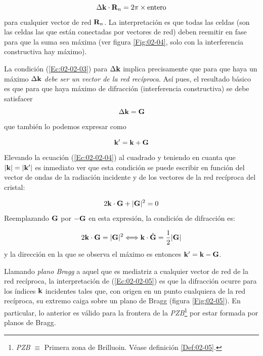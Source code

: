 \begin{equation}
    \Delta \mathbf{k} \cdot \mathbf{R}_n = 2 \pi \times \text{entero} \label{Ec:02-02-03}
\end{equation}
para cualquier vector de red $\mathbf{R}_n$. La interpretación es que todas las celdas (son las celdas las que están conectadas por vectores de red) deben reemitir en fase para que la suma sea máxima (ver figura \ref{Fig:02-04}, solo con la interferencia constructiva hay máximo).    


La condición (\ref{Ec:02-02-03}) para $\Delta \mathbf{k}$ implica precisamente que para que haya un máximo $\Delta \mathbf{k}$ \textit{debe ser un vector de la red recíproca}. Así pues, el resultado básico es que para que haya máximo de difracción (interferencia constructiva) se debe satisfacer 
\begin{equation}
    \Delta \mathbf{k} = \mathbf{G}\label{Ec:02-02-04}
\end{equation}
que también lo podemos expresar como 

\begin{equation*}
	\mathbf{k}' = \mathbf{k} + \mathbf{G}
\end{equation*}
Elevando la ecuación (\ref{Ec:02-02-04}) al cuadrado y teniendo en cuanta que $|\mathbf{k}|=|\mathbf{k}'|$ es inmediato ver que esta condición se puede escribir en función del vector de ondas de la radiación incidente y de los vectores de la red recíproca del cristal: 

\begin{equation*}
	2\mathbf{k} \cdot \mathbf{G} + |\mathbf{G}|^2 = 0
\end{equation*}
Reemplazando $\mathbf{G}$ por $-\mathbf{G}$ en esta expresión, la condición de difracción es: 

\begin{equation}
    2 \mathbf{k} \cdot \mathbf{G} = |\mathbf{G}|^2 \Longleftrightarrow \mathbf{k} \cdot \hat{\mathbf{G}} = \frac{1}{2} |\mathbf{G}| \label{Ec:02-02-05}
\end{equation}
y la dirección en la que se observa el máximo es entonces $\mathbf{k}'=\mathbf{k}-\mathbf{G}$. 


Llamando \textit{plano Bragg} a aquel que es mediatriz a cualquier vector de red de la red recíproca, la interpretación de (\ref{Ec:02-02-05}) es que la difracción ocurre para los índices $\mathbf{k}$ incidentes tales que, con origen en un punto cualquiera de la red recíproca, su extremo caiga sobre un plano de Bragg (figura \ref{Fig:02-05}). En particular, lo anterior es válido para la frontera de la \textit{PZB}\footnote{\textit{PZB} $\equiv$ Primera zona de Brilluoin. Véase definición \ref{Def:02-05}.} por estar formada por planos de Bragg. 

